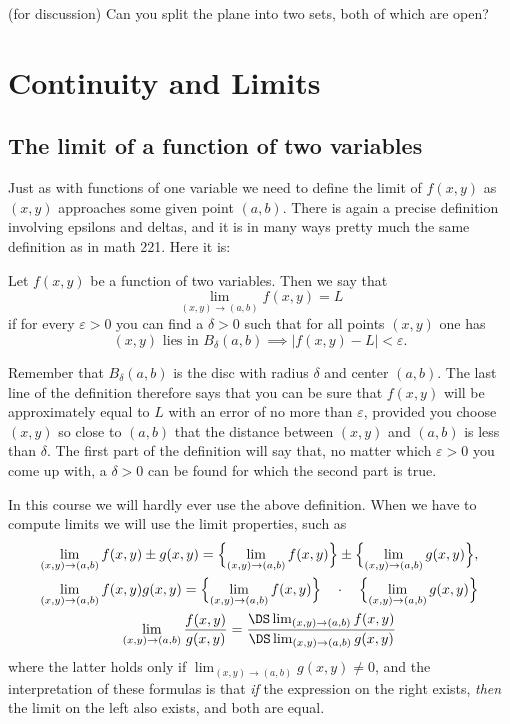 \problem (for discussion) Can you split the plane into two sets, both%
of which are open?

\rmfamily\normalsize

\section{Continuity and Limits} %

\subsection{The limit of a function of two variables} %
Just as with functions of one variable we need to define the limit of
$f(x, y)$ as $(x, y)$ approaches some given point $(a, b)$.
There is again a precise definition involving epsilons and deltas, and
it is in many ways pretty much the same definition as in math 221.
Here it is:
\begin{definition}
  Let $f(x, y)$ be a function of two variables. Then we say that
  $$
  \lim_{(x, y) \to (a, b)} f(x, y) = L
  $$
  if for every $\varepsilon>0$ you can find a $\delta>0$ such that for
  all points $(x, y)$ one has
  \[
  \text{$(x, y)$ lies in $B_{\delta}(a, b)$} \implies
  |f(x, y) - L| <\varepsilon.
  \]
  \label{def:01limit}
\end{definition}

Remember that $B_\delta(a, b)$ is the disc with radius $\delta$ and
center $(a, b)$.  The last line of the definition therefore says that
you can be sure that $f(x, y)$ will be approximately equal to
$L$ with an error of no more than $\varepsilon$, provided you choose
$(x, y)$ so close to $(a,b)$ that the distance between $(x, y)$ and
$(a,b)$ is less than $\delta$.  The first part of the definition will
say that, no matter which $\varepsilon>0$ you come up with, a
$\delta>0$ can be found for which the second part is true.

In this course we will hardly ever use the above definition.  When we
have to compute limits we will use the limit properties, such as
\begin{gather}
  \lim_{(x, y) \to (a, b)} f(x, y) \pm g(x, y) =
  \Bigl\{\lim_{(x, y) \to (a, b)} f(x, y)\Bigr\}
  \pm
  \Bigl\{\lim_{(x, y) \to (a, b)} g(x, y)\Bigr\},
  \\
  \lim_{(x, y) \to (a, b)} f(x, y)g(x, y)
  =
  \Bigl\{\lim_{(x, y) \to (a, b)} f(x, y)\Bigr\}
  \quad\cdot\quad
  \Bigl\{\lim_{(x, y) \to (a, b)} g(x, y) \Bigr\}
  \\
  \lim_{(x, y) \to (a, b)} \frac{f(x, y)}{g(x, y)} =
  \frac{\DS
  \lim_{(x, y) \to (a, b)} f(x, y)}
  {\DS\lim_{(x,y)\to(a,b)} g(x, y)}
\end{gather}
where the latter holds only if $\lim_{(x, y) \to (a, b)} g(x, y) \neq
0$, and the interpretation of these formulas is that \emph{if} the
expression on the right exists, \emph{then} the limit on the left also
exists, and both are equal.

